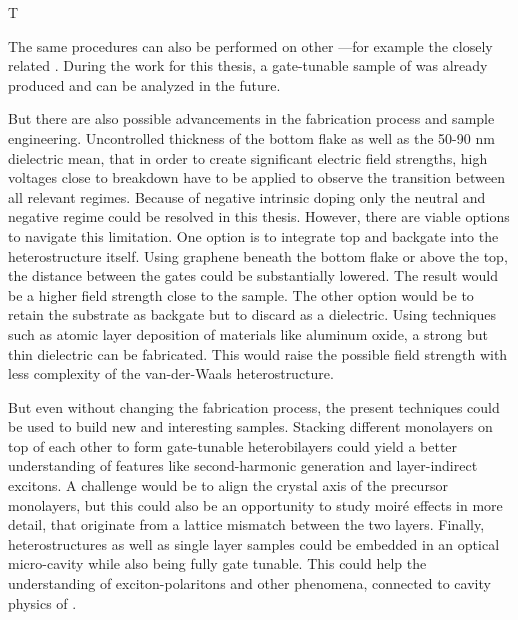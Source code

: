 T

The same procedures can also be performed on other \tmds\!---for example the closely related \ws\!. During the work for this thesis, a gate-tunable sample of \ws was already produced and can be analyzed in the future.

But there are also possible advancements in the fabrication process and sample engineering. Uncontrolled thickness of the bottom \hbng flake as well as the 50-90 nm \sio dielectric mean, that in order to create significant electric field strengths, high voltages close to breakdown have to be applied to observe the transition between all relevant regimes. Because of negative intrinsic doping only the neutral and negative regime could be resolved in this thesis. However, there are viable options to navigate this limitation. One option is to integrate top and backgate into the heterostructure itself. Using graphene beneath the bottom \hbng flake or above the top, the distance between the gates could be substantially lowered. The result would be a higher field strength close to the sample. The other option would be to retain the substrate as backgate but to discard \sio as a dielectric. Using techniques such as atomic layer deposition of materials like aluminum oxide, a strong but thin dielectric can be fabricated. This would raise the possible field strength with less complexity of the van-der-Waals heterostructure.

But even without changing the fabrication process, the present techniques could be used to build new and interesting samples. Stacking different \tmdg monolayers on top of each other to form gate-tunable heterobilayers could yield a better understanding of features like second-harmonic generation and layer-indirect excitons. A challenge would be to align the crystal axis of the precursor monolayers, but this could also be an opportunity to study moiré effects in more detail, that originate from a lattice mismatch between the two layers.
Finally, heterostructures as well as single layer samples could be embedded in an optical micro-cavity while also being fully gate tunable. This could help the understanding of exciton-polaritons and other phenomena, connected to cavity physics of \tmds.